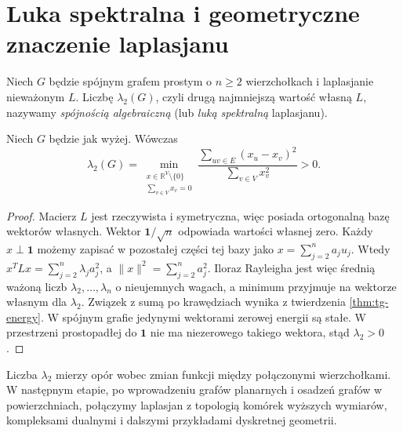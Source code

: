 \section{Luka spektralna i geometryczne znaczenie laplasjanu}
\label{sec:tg-spectral-gap}

\begin{definicja}
Niech $G$ będzie spójnym grafem prostym o $n\ge2$
wierzchołkach i laplasjanie nieważonym $L$.
Liczbę $\lambda_2(G)$, czyli drugą najmniejszą
wartość własną $L$, nazywamy \emph{spójnością algebraiczną}
(lub \emph{luką spektralną} laplasjanu).
\end{definicja}

\begin{twierdzenie}
Niech $G$ będzie jak wyżej. Wówczas
\[
\lambda_2(G)=\min_{\substack{x\in\mathbb R^V\setminus\{0\}\\
               \sum_{v\in V}x_v=0}}
\frac{\sum_{uv\in E}(x_u-x_v)^2}{\sum_{v\in V}x_v^2}>0.
\]
\end{twierdzenie}

\begin{proof}
Macierz $L$ jest rzeczywista i symetryczna, więc posiada
ortogonalną bazę wektorów własnych. Wektor
$\mathbf1/\sqrt n$ odpowiada wartości własnej zero.
Każdy $x\perp\mathbf1$ możemy zapisać w pozostałej
części tej bazy jako $x=\sum_{j=2}^na_ju_j$.
Wtedy $x^TLx=\sum_{j=2}^n\lambda_ja_j^2$,
a $\|x\|^2=\sum_{j=2}^na_j^2$.
Iloraz Rayleigha jest więc średnią ważoną liczb
$\lambda_2,\ldots,\lambda_n$ o nieujemnych wagach,
a minimum przyjmuje na wektorze własnym dla
$\lambda_2$. Związek z sumą po krawędziach wynika
z twierdzenia \ref{thm:tg-energy}.
W spójnym grafie jedynymi wektorami zerowej energii
są stałe. W przestrzeni prostopadłej do $\mathbf1$
nie ma niezerowego takiego wektora, stąd $\lambda_2>0$.
\end{proof}

Liczba $\lambda_2$ mierzy opór wobec zmian funkcji między
połączonymi wierzchołkami. W następnym etapie, po wprowadzeniu
grafów planarnych i osadzeń grafów w powierzchniach,
połączymy laplasjan z topologią komórek wyższych wymiarów,
kompleksami dualnymi i dalszymi przykładami dyskretnej geometrii.

